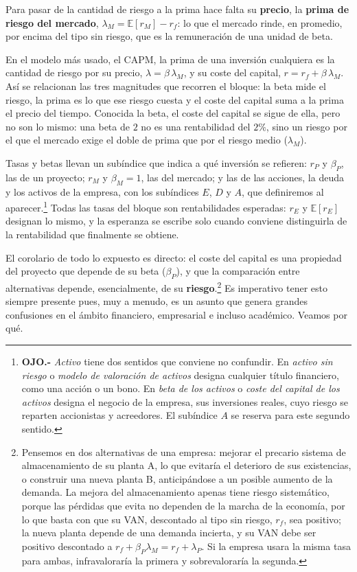 \documentclass[10pt,a4paper]{article}
\begin{document}
Para pasar de la cantidad de riesgo a la prima hace falta su \textbf{precio}, la \textbf{prima de riesgo del mercado}, $\lambda_M=\mathbb E[r_M]-r_f$: lo que el mercado rinde, en promedio, por encima del tipo sin riesgo, que es la remuneración de una unidad de beta. 

En el modelo más usado, el CAPM, la prima de una inversión cualquiera es la cantidad de riesgo por su precio, $\lambda=\beta\,\lambda_M$, y su coste del capital, $r=r_f+\beta\,\lambda_M$. Así se relacionan las tres magnitudes que recorren el bloque: la beta mide el riesgo, la prima es lo que ese riesgo cuesta y el coste del capital suma a la prima el precio del tiempo. Conocida la beta, el coste del capital se sigue de ella, pero no son lo mismo: una beta de $2$ no es una rentabilidad del $2\%$, sino un riesgo por el que el mercado exige el doble de prima que por el riesgo medio ($\lambda_M$).

Tasas y betas llevan un subíndice que indica a qué inversión se refieren: $r_P$ y $\beta_P$, las de un proyecto; $r_M$ y $\beta_M=1$, las del mercado; y las de las acciones, la deuda y los activos de la empresa, con los subíndices $E$, $D$ y $A$, que definiremos al aparecer.\footnote{%
    \textbf{OJO.-} \textit{Activo} tiene dos sentidos que conviene no confundir. En \textit{activo sin riesgo} o \textit{modelo de valoración de activos} designa cualquier título financiero, como una acción o un bono. En \textit{beta de los activos} o \textit{coste del capital de los activos} designa el negocio de la empresa, sus inversiones reales, cuyo riesgo se reparten accionistas y acreedores. El subíndice $A$ se reserva para este segundo sentido.
} Todas las tasas del bloque son rentabilidades esperadas: $r_E$ y $\mathbb E[r_E]$ designan lo mismo, y la esperanza se escribe solo cuando conviene distinguirla de la rentabilidad que finalmente se obtiene.

El corolario de todo lo expuesto es directo: el coste del capital es una propiedad del proyecto que depende de su beta ($\beta_P$), y que la comparación entre alternativas depende, esencialmente, de su \textbf{riesgo}.\footnote{%
  Pensemos en dos alternativas de una empresa: mejorar el precario sistema de almacenamiento de su planta A, lo que evitaría el deterioro de sus existencias, o construir una nueva planta B, anticipándose a un posible aumento de la demanda. La mejora del almacenamiento apenas tiene riesgo sistemático, porque las pérdidas que evita no dependen de la marcha de la economía, por lo que basta con que su VAN, descontado al tipo sin riesgo, $r_f$, sea positivo; la nueva planta depende de una demanda incierta, y su VAN debe ser positivo descontado a $r_f+\beta_P\lambda_M= r_f+\lambda_P$. Si la empresa usara la misma tasa para ambas, infravaloraría la primera y sobrevaloraría la segunda.
} Es imperativo tener esto siempre presente pues, muy a menudo, es un asunto que genera grandes confusiones en el ámbito financiero, empresarial e incluso académico. Veamos por qué.
\end{document}
